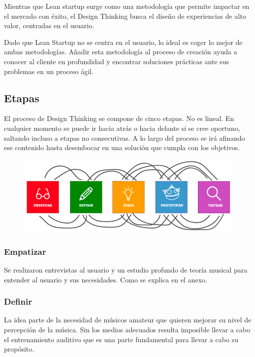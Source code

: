\documentclass[12pt,twoside,titlepage]{report}
\begin{document}
Mientras que Lean startup surge como una metodología que permite impactar en el mercado con éxito, el Design Thinking busca el diseño de experiencias de alto valor, centradas en el usuario.

Dado que Lean Startup no se centra en el usuario, lo ideal es coger lo mejor de ambas metodologías. Añadir esta metodología al proceso de creación ayuda a conocer al cliente en profundidad y encontrar soluciones prácticas ante sus problemas en un proceso ágil.

\subsection{Etapas}

El proceso de Design Thinking se compone de cinco etapas. No es lineal. En cualquier momento se puede ir hacia atrás o hacia delante si se cree oportuno, saltando incluso a etapas no consecutivas. A lo largo del proceso se irá afinando ese contenido hasta desembocar en una solución que cumpla con los objetivos. 

\begin{figure}[H] 
    \includegraphics[scale=0.44]{Design Thinking/Etapas}
    \centering
    \label{fig:Design Thinking}
\end{figure}

\subsubsection{Empatizar}

Se realizaron entrevistas al usuario y un estudio profundo de teoría musical para entender al usuario y sus necesidades. Como se explica en el anexo.

\subsubsection{Definir}

La idea parte de la necesidad de músicos amateur que quieren mejorar su nivel de percepción de la música. Sin los medios adecuados resulta imposible llevar a cabo el entrenamiento auditivo que es una parte fundamental para llevar a cabo su propósito. 
\end{document}
